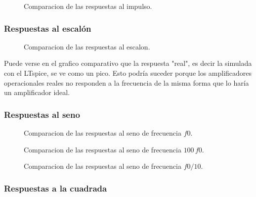 \documentclass[10pt,a4paper]{article}
\begin{document}
    \begin{figure}[H]
        \centering
        \scalebox{0.85}{}
        \caption{Comparacion de las respuestas al impulso.}
        \label{fig}
    \end{figure}

    \subsubsection{Respuestas al escalón}

    \begin{figure}[H]
        \centering
        \scalebox{0.85}{}
        \caption{Comparacion de las respuestas al escalon.}
        \label{fig}
    \end{figure}

    Puede verse en el grafico comparativo que la respuesta "real", es decir la simulada con el LTspice, se ve como un pico. Esto podría suceder porque los amplificadores operacionales reales no responden a la frecuencia de la misma forma que lo haría  un amplificador ideal.
    \subsubsection{Respuestas al seno}


    \begin{figure}[H]
        \centering
        \scalebox{0.85}{}
        \caption{Comparacion de las respuestas al seno de frecuencia $f0$.}
        \label{fig}
    \end{figure}


    \begin{figure}[H]
        \centering
        \scalebox{0.85}{}
        \caption{Comparacion de las respuestas al seno de frecuencia $100\, f0$.}
        \label{fig}
    \end{figure}


    \begin{figure}[H]
        \centering
        \scalebox{0.85}{}
        \caption{Comparacion de las respuestas al seno de frecuencia $f0/10$.}
        \label{fig}
    \end{figure}

    \subsubsection{Respuestas a la cuadrada}
\end{document}
